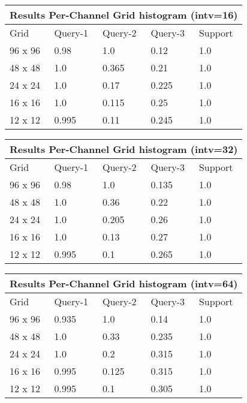 \documentclass[12pt]{article}
\begin{document}
\begin{tabular}{ |p{1.5cm}||p{2cm}|p{2cm}|p{2cm}|p{2cm}|  }
    \hline
    \multicolumn{5}{|c|}{Results Per-Channel Grid histogram (intv=16)} \\
    \hline
    Grid & Query-1 & Query-2 & Query-3 & Support \\
    \hline
    96 x 96 & 0.98 & 1.0 & 0.12 & 1.0 \\
    \hline
    48 x 48 & 1.0 & 0.365 & 0.21 & 1.0 \\
    \hline
    24 x 24 & 1.0 & 0.17 & 0.225 & 1.0 \\
    \hline
    16 x 16 & 1.0 & 0.115 & 0.25 & 1.0 \\
    \hline
    12 x 12 & 0.995 & 0.11 & 0.245 & 1.0 \\
    \hline
\end{tabular}

\begin{tabular}{ |p{1.5cm}||p{2cm}|p{2cm}|p{2cm}|p{2cm}|  }
    \hline
    \multicolumn{5}{|c|}{Results Per-Channel Grid histogram (intv=32)} \\
    \hline
    Grid & Query-1 & Query-2 & Query-3 & Support \\
    \hline
    96 x 96 & 0.98 & 1.0 & 0.135 & 1.0 \\
    \hline
    48 x 48 & 1.0 & 0.36 & 0.22 & 1.0 \\
    \hline
    24 x 24 & 1.0 & 0.205 & 0.26 & 1.0 \\
    \hline
    16 x 16 & 1.0 & 0.13 & 0.27 & 1.0 \\
    \hline
    12 x 12 & 0.995 & 0.1 & 0.265 & 1.0 \\
    \hline
\end{tabular}

\begin{tabular}{ |p{1.5cm}||p{2cm}|p{2cm}|p{2cm}|p{2cm}|  }
    \hline
    \multicolumn{5}{|c|}{Results Per-Channel Grid histogram (intv=64)} \\
    \hline
    Grid & Query-1 & Query-2 & Query-3 & Support \\
    \hline
    96 x 96 & 0.935 & 1.0 & 0.14 & 1.0 \\
    \hline
    48 x 48 & 1.0 & 0.33 & 0.235 & 1.0 \\
    \hline
    24 x 24 & 1.0 & 0.2 & 0.315 & 1.0 \\
    \hline
    16 x 16 & 0.995 & 0.125 & 0.315 & 1.0 \\
    \hline
    12 x 12 & 0.995 & 0.1 & 0.305 & 1.0 \\
    \hline
\end{tabular}
\end{document}
